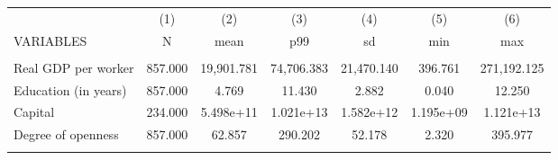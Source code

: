 \documentclass[]{article}
\begin{document}
\begin{tabular}{lcccccc} \hline
 & (1) & (2) & (3) & (4) & (5) & (6) \\
VARIABLES & N & mean & p99 & sd & min & max \\ \hline
 &  &  &  &  &  &  \\
Real GDP per worker & 857.000 & 19,901.781 & 74,706.383 & 21,470.140 & 396.761 & 271,192.125 \\
Education (in years) & 857.000 & 4.769 & 11.430 & 2.882 & 0.040 & 12.250 \\
Capital & 234.000 & 5.498e+11 & 1.021e+13 & 1.582e+12 & 1.195e+09 & 1.121e+13 \\
Degree of openness & 857.000 & 62.857 & 290.202 & 52.178 & 2.320 & 395.977 \\
 &  &  &  &  &  &  \\ \hline
\end{tabular}
\end{document}

